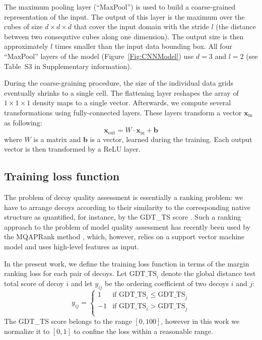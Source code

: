 \documentclass{bioinfo}
\begin{document}
The maximum pooling layer (``MaxPool'') is used to build a
coarse-grained representation of the input. The output of this layer
is the maximum over the cubes of size $d \times d \times d$ that cover
the input domain with the stride $l$ (the distance between two
consequtive cubes along one dimension).  The output size is then
approximately $l$ times smaller than the input data bounding box.  All
four ``MaxPool'' layers of the model (Figure~\ref{Fig:CNNModel}) use
$d=3$ and $l=2$ (see Table~S3 in Supplementary information).

During the coarse-graining procedure, the size of the individual data
grids eventually shrinks to a single cell. The flattening layer
reshapes the array of $1\times 1\times 1$ density maps to a single
vector. Afterwards, we compute several transformations using
fully-connected layers. These layers transform a vector
$\mathbf{x}_\text{in}$ as following:
\begin{equation}
\mathbf{x}_\text{out} = W \cdot \mathbf{x}_\text{in} + \mathbf{b}
\end{equation}
where $W$ is a matrix and $\mathbf{b}$ is a vector, learned during the
training. Each output vector is then transformed by a ReLU layer.
%
%
\subsection{Training loss function}
%
%
The problem of decoy quality assessment is essentially a ranking
problem: we have to arrange decoys according to their similarity to
the corresponding native structure as quantified, for instance, by the GDT\_TS score
\citep{zemla2001casp4}. Such a ranking approach to the
problem of model quality assessment has recently been used by the
MQAPRank method \citep{jing2016sorting}, which, however, relies on a
support vector machine model and uses high-level features as
input.

In the present work, we define the training loss function in terms of
the margin ranking loss \citep{joachims2002optimizing, gong2013deep}
for each pair of decoys.  Let $\text{GDT\_TS}_i$ denote the global
distance test total score of decoy $i$ and let $y_{ij}$ be the
ordering coefficient of two decoys $i$ and $j$:
\begin{equation}
y_{ij} = \begin{cases}
               1& \text{if }\text{GDT\_TS}_i \leq \text{GDT\_TS}_j \\
               -1& \text{if }\text{GDT\_TS}_i > \text{GDT\_TS}_j \\
            \end{cases}
\end{equation}
The GDT\_TS score belongs to the range $[0, 100]$, however in this work we normalize it to $[0,1]$ 
to confine the loss within a reasonable range.
\end{document}
